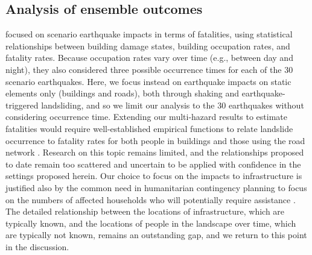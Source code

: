 \documentclass[nhess, manuscript]{copernicus}
\begin{document}
\subsection{Analysis of ensemble outcomes}
\label{sec:analysis}

\citet{Robinson2018} focused on scenario earthquake impacts in terms of fatalities, using statistical relationships between building damage states, building occupation rates, and fatality rates. Because occupation rates vary over time (e.g., between day and night), they also considered three possible occurrence times for each of the 30 scenario earthquakes. Here, we focus instead on earthquake impacts on static elements only (buildings and roads), both through shaking and earthquake-triggered landsliding, and so we limit our analysis to the 30 earthquakes without considering occurrence time. Extending our multi-hazard results to estimate fatalities would require well-established empirical functions to relate landslide occurrence to fatality rates for both people in buildings and those using the road network \citep{VanWykDeVries2024}. Research on this topic remains limited, and the relationships proposed to date \citep{Pollock2020,Luo2023,Hu2024} remain too scattered and uncertain to be applied with confidence in the settings proposed herein. Our choice to focus on the impacts to infrastructure is justified also by the common need in humanitarian contingency planning to focus on the numbers of affected households who will potentially require assistance \citep{IASC2007, sijapati2025}. The detailed relationship between the locations of infrastructure, which are typically known, and the locations of people in the landscape over time, which are typically not known, remains an outstanding gap, and we return to this point in the discussion.
\end{document}
